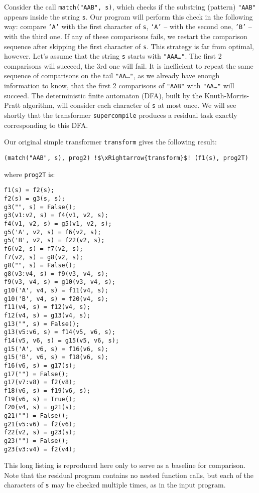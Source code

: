 Consider the call \texttt{match("AAB", s)}, 
which checks if the substring (pattern) \texttt{"AAB"} appears inside the string \texttt{s}.
Our program will perform this check in the following way: compare \texttt{`A'}
with the first character of \texttt{s}, \texttt{`A'} -- with the second one,
\texttt{'B'} -- with the third one.
If any of these comparisons fails, we restart the comparison sequence
after skipping the first character of \texttt{s}.
This strategy is far from optimal, however.
Let's assume that the string \texttt{s} starts with \texttt{"AAA\ldots"}.
The first 2 comparisons will succeed, the 3rd one will fail.
It is inefficient to repeat the same sequence of comparisons
on the tail \texttt{"AA\ldots"},
as we already have enough information to know, that the first 2 comparisons of \texttt{"AAB"}
with \texttt{"AA\ldots"} will succeed. 
The deterministic finite automaton (DFA), built by the Knuth-Morris-Pratt algorithm,
will consider each character of \texttt{s} at most once.
We will see shortly that the transformer \texttt{supercompile} produces
a residual task exactly corresponding to this DFA.

Our original simple transformer \texttt{transform} gives the following result:
\begin{lstlisting}[language=sll,escapechar=!]
(match("AAB", s), prog2) !$\xRightarrow{transform}$! (f1(s), prog2T)
\end{lstlisting}
where \texttt{prog2T} is:
\begin{lstlisting}[language=sll]
f1(s) = f2(s);
f2(s) = g3(s, s);
g3("", s) = False();
g3(v1:v2, s) = f4(v1, v2, s);
f4(v1, v2, s) = g5(v1, v2, s);
g5('A', v2, s) = f6(v2, s);
g5('B', v2, s) = f22(v2, s);
f6(v2, s) = f7(v2, s);
f7(v2, s) = g8(v2, s);
g8("", s) = False();
g8(v3:v4, s) = f9(v3, v4, s);
f9(v3, v4, s) = g10(v3, v4, s);
g10('A', v4, s) = f11(v4, s);
g10('B', v4, s) = f20(v4, s);
f11(v4, s) = f12(v4, s);
f12(v4, s) = g13(v4, s);
g13("", s) = False();
g13(v5:v6, s) = f14(v5, v6, s);
f14(v5, v6, s) = g15(v5, v6, s);
g15('A', v6, s) = f16(v6, s);
g15('B', v6, s) = f18(v6, s);
f16(v6, s) = g17(s);
g17("") = False();
g17(v7:v8) = f2(v8);
f18(v6, s) = f19(v6, s);
f19(v6, s) = True();
f20(v4, s) = g21(s);
g21("") = False();
g21(v5:v6) = f2(v6);
f22(v2, s) = g23(s);
g23("") = False();
g23(v3:v4) = f2(v4);
\end{lstlisting}
This long listing is reproduced here only to serve as a baseline for comparison.
Note that the residual program contains no nested function calls,
but each of the characters of \texttt{s} may be checked multiple times, as in the input program.

